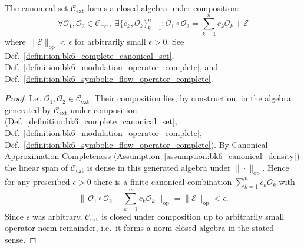 \begin{theorem}
\label{theorem:bk6_complete_operator_closure}
The canonical set $\mathcal{C}_{\text{ext}}$ forms a closed algebra under composition:
\begin{equation}
\forall \mathcal{O}_1, \mathcal{O}_2 \in \mathcal{C}_{\text{ext}}, \; \exists \{c_k, \mathcal{O}_k\}_{k=1}^n : \mathcal{O}_1 \circ \mathcal{O}_2 = \sum_{k=1}^n c_k \mathcal{O}_k + \mathcal{E}
\end{equation}
where $\|\mathcal{E}\|_{\text{op}} < \epsilon$ for arbitrarily small $\epsilon > 0$.
See Def.~\ref{definition:bk6_complete_canonical_set}, Def.~\ref{definition:bk6_modulation_operator_complete}, and Def.~\ref{definition:bk6_symbolic_flow_operator_complete}.
\end{theorem}
\begin{proof}
\label{proof:bk6_complete_operator_closure}
\leavevmode
Let $\mathcal{O}_1,\mathcal{O}_2\in\mathcal{C}_{\text{ext}}$. Their composition lies, by construction, in the algebra generated by $\mathcal{C}_{\text{ext}}$ under composition (Def.~\ref{definition:bk6_complete_canonical_set}, Def.~\ref{definition:bk6_modulation_operator_complete}, Def.~\ref{definition:bk6_symbolic_flow_operator_complete}). By Canonical Approximation Completeness (Assumption~\ref{assumption:bk6_canonical_density}) the linear span of $\mathcal{C}_{\text{ext}}$ is dense in this generated algebra under $\|\cdot\|_{\text{op}}$. Hence for any prescribed $\epsilon>0$ there is a finite canonical combination $\sum_{k=1}^n c_k\mathcal{O}_k$ with
\[
\Big\|\,\mathcal{O}_1\circ\mathcal{O}_2-\textstyle\sum_{k=1}^n c_k\mathcal{O}_k\,\Big\|_{\text{op}}=\|\mathcal{E}\|_{\text{op}}<\epsilon .
\]
Since $\epsilon$ was arbitrary, $\mathcal{C}_{\text{ext}}$ is closed under composition up to arbitrarily small operator-norm remainder, i.e.\ it forms a norm-closed algebra in the stated sense.
\end{proof}

